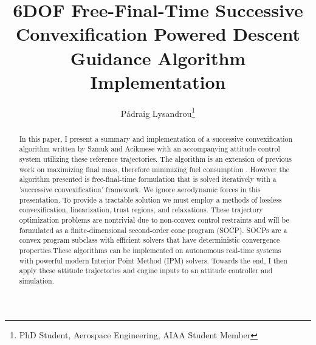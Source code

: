\documentclass[conf]{new-aiaa}
\title{6DOF Free-Final-Time Successive Convexification Powered Descent Guidance Algorithm Implementation}
\author{Pádraig Lysandrou\footnote{PhD Student, Aerospace Engineering, AIAA Student Member}}
\affil{University of Colorado Boulder, Boulder, Colorado, 80301}
\affil{Final Project for ASEN6519: Aerospace Vehicle Guidance \& Control}
\begin{document}
\maketitle

\begin{singlespace}
\begin{abstract}
In this paper, I present a summary and implementation of a successive convexification algorithm written by Szmuk and Acikmese\cite{6dofsucc} with an accompanying attitude control system utilizing these reference trajectories. The algorithm is an extension of previous work on maximizing final mass, therefore minimizing fuel consumption \cite{ploen2007} \cite{becet2016} \cite{enhancements2008}. However the algorithm presented is free-final-time formulation that is solved iteratively with a 'successive convexification' framework. We ignore aerodynamic forces in this presentation.  To provide a tractable solution we must employ a methods of lossless convexification, linearization, trust regions, and relaxations. These trajectory optimization problems are nontrivial due to non-convex control restraints and will be formulated as a finite-dimensional second-order cone program (SOCP). SOCPs are a convex program subclass with efficient solvers that have deterministic convergence properties.These algorithms can be implemented on autonomous real-time systems with powerful modern Interior Point Method (IPM) solvers.
Towards the end, I then apply these attitude trajectories and engine inputs to an attitude controller and simulation.

\end{abstract}


\end{singlespace}
\end{document}

